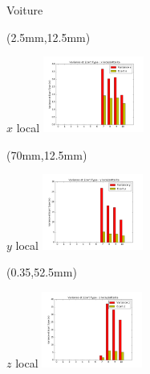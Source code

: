 \documentclass[10pt]{beamer}
\begin{document}
	\begin{frame}{Voiture}
		\begin{textblock*}{60mm}(2.5mm,12.5mm)
			\begin{block}{$x$ local}
				\includegraphics[width=125px]{../src/data/itinary_3/var_ecart_sat_x3.png}
			\end{block}
		\end{textblock*}

		\begin{textblock*}{60mm}(70mm,12.5mm)
			\begin{block}{$y$ local}
				\includegraphics[width=125px]{../src/data/itinary_3/var_ecart_sat_y3.png}
			\end{block}
		\end{textblock*}

		\begin{textblock*}{60mm}(0.35\textwidth,52.5mm)
			\begin{block}{$z$ local}
				\includegraphics[width=125px]{../src/data/itinary_3/var_ecart_sat_z3.png}
			\end{block}
		\end{textblock*}
	\end{frame}
\end{document}

